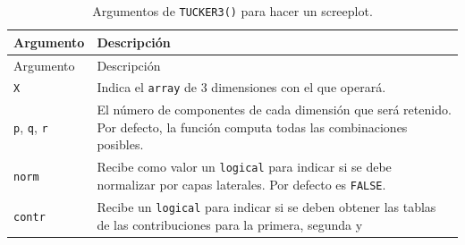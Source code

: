 \documentclass[
  spanish,
]{article}
\begin{document}
\begin{longtable}[]{@{}ll@{}}
\caption{Argumentos de \texttt{TUCKER3()} para hacer un screeplot.}\tabularnewline
\toprule
\begin{minipage}[b]{0.14\columnwidth}\raggedright
Argumento\strut
\end{minipage} & \begin{minipage}[b]{0.72\columnwidth}\raggedright
Descripción\strut
\end{minipage}\tabularnewline
\midrule
\endfirsthead
\toprule
\begin{minipage}[b]{0.14\columnwidth}\raggedright
Argumento\strut
\end{minipage} & \begin{minipage}[b]{0.72\columnwidth}\raggedright
Descripción\strut
\end{minipage}\tabularnewline
\midrule
\endhead
\begin{minipage}[t]{0.14\columnwidth}\raggedright
\texttt{X}\strut
\end{minipage} & \begin{minipage}[t]{0.72\columnwidth}\raggedright
Indica el \texttt{array} de 3 dimensiones con el que operará.\strut
\end{minipage}\tabularnewline
\begin{minipage}[t]{0.14\columnwidth}\raggedright
\texttt{p}, \texttt{q},
\texttt{r}\strut
\end{minipage} & \begin{minipage}[t]{0.72\columnwidth}\raggedright
El número de componentes de cada dimensión que será retenido.
Por defecto, la función computa todas las combinaciones posibles.\strut
\end{minipage}\tabularnewline
\begin{minipage}[t]{0.14\columnwidth}\raggedright
\texttt{norm}\strut
\end{minipage} & \begin{minipage}[t]{0.72\columnwidth}\raggedright
Recibe como valor un \texttt{logical} para indicar si se debe
normalizar por capas laterales. Por defecto es \texttt{FALSE}.\strut
\end{minipage}\tabularnewline
\begin{minipage}[t]{0.14\columnwidth}\raggedright
\texttt{contr}\strut
\end{minipage} & \begin{minipage}[t]{0.72\columnwidth}\raggedright
Recibe un \texttt{logical} para indicar si se deben obtener las
tablas de las contribuciones para la primera, segunda y

\end{minipage}
\end{longtable}
\end{document}
